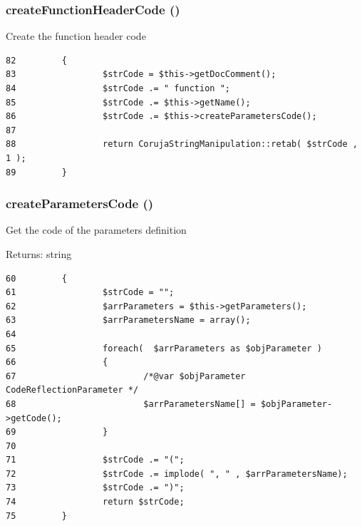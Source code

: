 \hypertarget{class_code_reflection_function_50033a1ad949372dc9cd146843ffbdae}{
\subsubsection[{createFunctionHeaderCode}]{\setlength{\rightskip}{0pt plus 5cm}createFunctionHeaderCode ()}}
\label{class_code_reflection_function_50033a1ad949372dc9cd146843ffbdae}


Create the function header code 

\begin{Code}\begin{verbatim}82         {
83                 $strCode = $this->getDocComment();
84                 $strCode .= " function ";
85                 $strCode .= $this->getName();
86                 $strCode .= $this->createParametersCode();
87 
88                 return CorujaStringManipulation::retab( $strCode , 1 );
89         }
\end{verbatim}
\end{Code}


\hypertarget{class_code_reflection_function_bcae75d179d0d3b4c5d5aafcd3f3bcdc}{
\subsubsection[{createParametersCode}]{\setlength{\rightskip}{0pt plus 5cm}createParametersCode ()}}
\label{class_code_reflection_function_bcae75d179d0d3b4c5d5aafcd3f3bcdc}


Get the code of the parameters definition

\begin{Desc}
\item[Returns:]string \end{Desc}


\begin{Code}\begin{verbatim}60         {
61                 $strCode = "";
62                 $arrParameters = $this->getParameters();
63                 $arrParametersName = array();
64 
65                 foreach(  $arrParameters as $objParameter )
66                 {
67                         /*@var $objParameter CodeReflectionParameter */
68                         $arrParametersName[] = $objParameter->getCode();
69                 }
70 
71                 $strCode .= "(";
72                 $strCode .= implode( ", " , $arrParametersName);
73                 $strCode .= ")";
74                 return $strCode;
75         }
\end{verbatim}
\end{Code}


